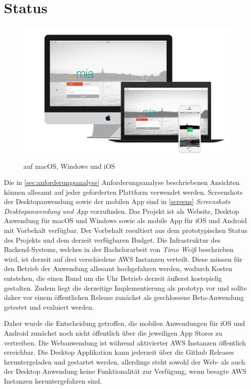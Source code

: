 \newpage

\section{Status}

\begin{figure}[h]
 \centering
  \includegraphics[width=1\linewidth]{kapitel5/showcase.png}
 \caption{\projectname{} auf macOS, Windows und iOS}
 \label{kapitel5/cross}
\end{figure}
\vspace{0.3cm}

\noindent Die in \ref{sec:anforderungsanalyse} Anforderungsanalyse beschriebenen Ansichten können allesamt auf jeder geforderten Plattform verwendet werden.
Screenshots der Desktopanwendung sowie der mobilen App sind in \ref{screens} \emph{Screenshots Desktopanwendung und App} vorzufinden.
Das Projekt \projectname{} ist als Website, Desktop Anwendung für macOS und Windows sowie als mobile App für iOS und Android mit Vorbehalt verfügbar.
Der Vorbehalt resultiert aus dem prototypischen Status des Projekts und dem derzeit verfügbaren Budget.
Die Infrastruktur des Backend-Systems, welches in der Bachelorarbeit von \emph{Timo Weiß} beschrieben wird,
ist derzeit auf drei verschiedene \ac{AWS} Instanzen verteilt. Diese müssen für den Betrieb der Anwendung allesamt
hochgefahren werden, wodurch Kosten entstehen, die einen Rund um die Uhr Betrieb derzeit äußerst kostspielig gestalten.
Zudem liegt die derzeitige Implementierung als prototyp vor und sollte daher vor einem
öffentlichen Release zunächst als geschlossene Beta-Anwendung getestet und evaluiert werden.

Daher wurde die Entscheidung getroffen, die mobilen Anwendungen für iOS und Android zunächst noch nicht öffentlich über die jeweiligen App Stores zu vertreiben.
Die Webanwendung ist während aktivierter \ac{AWS} Instanzen öffentlich erreichbar.
Die Desktop Applikation kann jederzeit über die Github Releases heruntergeladen und gestartet werden,
allerdings steht sowohl der Web- als auch der Desktop Anwendung keine Funktionalität zur Verfügung, wenn besagte \ac{AWS}
Instanzen heruntergefahren sind.

